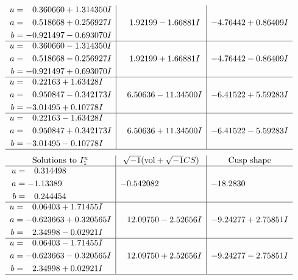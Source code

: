 \documentclass[1p]{elsarticle_modified}
\theoremstyle{definition}
\newcommand{\I}{\sqrt{-1}}
\begin{document}
$$\begin{array}{c|c|c}
\begin{aligned}
u &= \phantom{-}0.360660 + 1.314350 I \\
a &= \phantom{-}0.518668 + 0.256927 I \\
b &= -0.921497 - 0.693070 I\end{aligned}
 & \phantom{-}1.92199 - 1.66881 I & -4.76442 + 0.86409 I \\ \hline\begin{aligned}
u &= \phantom{-}0.360660 - 1.314350 I \\
a &= \phantom{-}0.518668 - 0.256927 I \\
b &= -0.921497 + 0.693070 I\end{aligned}
 & \phantom{-}1.92199 + 1.66881 I & -4.76442 - 0.86409 I \\ \hline\begin{aligned}
u &= \phantom{-}0.22163 + 1.63428 I \\
a &= \phantom{-}0.950847 - 0.342173 I \\
b &= -3.01495 + 0.10778 I\end{aligned}
 & \phantom{-}6.50636 - 11.34500 I & -6.41522 + 5.59283 I \\ \hline\begin{aligned}
u &= \phantom{-}0.22163 - 1.63428 I \\
a &= \phantom{-}0.950847 + 0.342173 I \\
b &= -3.01495 - 0.10778 I\end{aligned}
 & \phantom{-}6.50636 + 11.34500 I & -6.41522 - 5.59283 I\\
 \hline 
 \end{array}$$\newpage$$\begin{array}{c|c|c}  
\text{Solutions to }I^u_{1}& \I (\text{vol} + \sqrt{-1}CS) & \text{Cusp shape}\\
 \hline 
\begin{aligned}
u &= \phantom{-}0.314498\phantom{ +0.000000I} \\
a &= -1.13389\phantom{ +0.000000I} \\
b &= \phantom{-}0.244454\phantom{ +0.000000I}\end{aligned}
 & -0.542082\phantom{ +0.000000I} & -18.2830\phantom{ +0.000000I} \\ \hline\begin{aligned}
u &= \phantom{-}0.06403 + 1.71455 I \\
a &= -0.623663 + 0.320565 I \\
b &= \phantom{-}2.34998 - 0.02921 I\end{aligned}
 & \phantom{-}12.09750 - 2.52656 I & -9.24277 + 2.75851 I \\ \hline\begin{aligned}
u &= \phantom{-}0.06403 - 1.71455 I \\
a &= -0.623663 - 0.320565 I \\
b &= \phantom{-}2.34998 + 0.02921 I\end{aligned}
 & \phantom{-}12.09750 + 2.52656 I & -9.24277 - 2.75851 I\\
 \hline 
 \end{array}$$\newpage\newpage\renewcommand{\arraystretch}{1}
\end{document}
